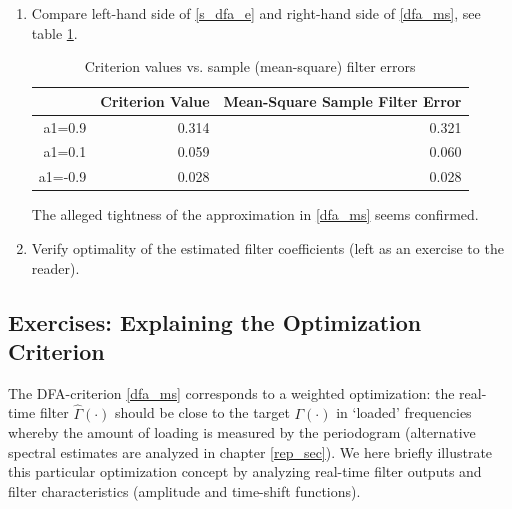 \documentclass[a4paper]{book}
\begin{document}
\begin{enumerate}
\begin{Schunk}
\begin{Sinput}
> # Compute time-domain MSE
> mse<-apply(na.exclude((yhat-y))^2,2,mean)
> perf_mat[,2]<-mse
> round(perf_mat[,2],3)
\end{Sinput}
\begin{Soutput}
 a1=0.9  a1=0.1 a1=-0.9 
  0.321   0.060   0.028 
\end{Soutput}
\end{Schunk}
\item Compare left-hand side of \ref{s_dfa_e} and right-hand side of \ref{dfa_ms}, see table \ref{perf_mat}.\\ 
\begin{table}[ht]
\centering
\begin{tabular}{rrr}
  \hline
 & Criterion Value & Mean-Square Sample Filter Error \\ 
  \hline
a1=0.9 & 0.314 & 0.321 \\ 
  a1=0.1 & 0.059 & 0.060 \\ 
  a1=-0.9 & 0.028 & 0.028 \\ 
   \hline
\end{tabular}
\caption{Criterion values vs. sample (mean-square) filter errors} 
\label{perf_mat}
\end{table}The alleged tightness of the approximation in \ref{dfa_ms} seems confirmed.
\item Verify optimality of the estimated filter coefficients (left as an exercise to the reader).

\end{enumerate}



\subsection{Exercises: Explaining the Optimization Criterion}\label{ex_dfa}

The DFA-criterion \ref{dfa_ms} corresponds to a weighted optimization: the real-time filter $\hat{\Gamma}(\cdot)$ should be close to the target $\Gamma(\cdot)$ in `loaded' frequencies whereby the amount of loading is measured by the periodogram (alternative spectral estimates are analyzed in chapter \ref{rep_sec}). We here briefly illustrate this particular optimization concept by analyzing real-time filter outputs and filter characteristics (amplitude and time-shift functions).
\end{document}
